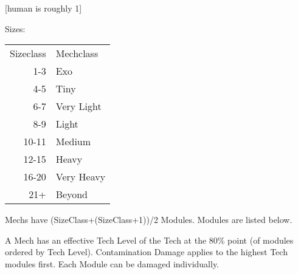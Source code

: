 \documentclass{article}
\begin{document}
    [human is roughly 1]\par
    Sizes:\newline
    \begin{tabular}{r|l}
        Sizeclass &Mechclass \\
        1-3 &Exo\\
        4-5 &Tiny\\
        6-7 &Very Light\\
        8-9 &Light\\
        10-11 &Medium\\
        12-15 &Heavy\\
        16-20 &Very Heavy\\
        21+ &Beyond\\
    \end{tabular}\newline
    Mechs have (SizeClass+(SizeClass+1))/2 Modules. Modules are listed below. \par
    A Mech has an effective Tech Level of the Tech at the 80\% point (of modules ordered by Tech Level).\newline
    Contamination Damage applies to the highest Tech modules first. Each Module can be damaged individually.\newline
    \newline
\end{document}
